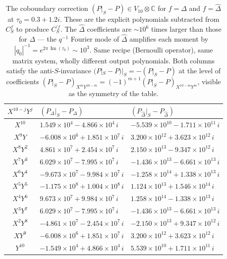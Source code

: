 \documentclass[11pt,letterpaper]{article}
\newcommand{\CC}{\mathbb{C}}
\DeclareMathOperator{\im}{Im}
\begin{document}
\begin{table}[h]\centering
\small
\renewcommand{\arraystretch}{1.15}
\begin{tabular}{c|l|l}
\toprule
$X^{10-j}Y^j$ & $(P_\Delta|_S - P_\Delta)$ & $(P_{\widehat\Delta}|_S - P_{\widehat\Delta})$ \\
\midrule
$X^{10}$  & $1.549\times 10^{4} - 4.866\times 10^{4}\,i$    & $-5.539\times 10^{10} - 1.711\times 10^{11}\,i$ \\
$X^9 Y$   & $-6.008\times 10^{6} + 1.851\times 10^{7}\,i$   & $3.200\times 10^{12} + 3.623\times 10^{12}\,i$ \\
$X^8 Y^2$ & $4.861\times 10^{7} + 2.454\times 10^{7}\,i$    & $2.150\times 10^{13} - 9.347\times 10^{12}\,i$ \\
$X^7 Y^3$ & $6.029\times 10^{7} - 7.995\times 10^{7}\,i$    & $-1.436\times 10^{13} - 6.661\times 10^{13}\,i$ \\
$X^6 Y^4$ & $-9.673\times 10^{7} - 9.984\times 10^{7}\,i$   & $-1.258\times 10^{14} + 1.338\times 10^{13}\,i$ \\
$X^5 Y^5$ & $-1.175\times 10^{8} + 1.004\times 10^{8}\,i$   & $1.124\times 10^{13} + 1.546\times 10^{14}\,i$ \\
$X^4 Y^6$ & $9.673\times 10^{7} + 9.984\times 10^{7}\,i$    & $1.258\times 10^{14} - 1.338\times 10^{13}\,i$ \\
$X^3 Y^7$ & $6.029\times 10^{7} - 7.995\times 10^{7}\,i$    & $-1.436\times 10^{13} - 6.661\times 10^{13}\,i$ \\
$X^2 Y^8$ & $-4.861\times 10^{7} - 2.454\times 10^{7}\,i$   & $-2.150\times 10^{13} + 9.347\times 10^{12}\,i$ \\
$X Y^9$   & $-6.008\times 10^{6} + 1.851\times 10^{7}\,i$   & $3.200\times 10^{12} + 3.623\times 10^{12}\,i$ \\
$Y^{10}$  & $-1.549\times 10^{4} + 4.866\times 10^{4}\,i$   & $5.539\times 10^{10} + 1.711\times 10^{11}\,i$ \\
\bottomrule
\end{tabular}
\caption{The coboundary correction $(P|_S - P) \in V_{10}\otimes\CC$ for
$f = \Delta$ and $f = \widehat\Delta$ at $\tau_0 = 0.3 + 1.2i$.  These
are the explicit polynomials subtracted from $C^f_S$ to produce
$C^{\prime f}_S$.  The $\widehat\Delta$ coefficients are $\sim 10^6$ times
larger than those for $\Delta$ --- the $q^{-1}$ Fourier mode of
$\widehat\Delta$ amplifies each moment by $|q_0|^{-1} = e^{2\pi\,\im(\tau_0)}
\sim 10^3$.  Same recipe (Bernoulli operator), same matrix system, wholly
different output polynomials.  Both columns satisfy the anti-$S$-invariance
$(P|_S - P)|_S = -(P|_S - P)$ at the level of coefficients
$(P|_S - P)_{X^m Y^{10-m}} = (-1)^{m+1}(P|_S - P)_{X^{10-m}Y^m}$, visible
as the symmetry of the table.}\label{tab:coboundary-vals}
\end{table}
\end{document}
